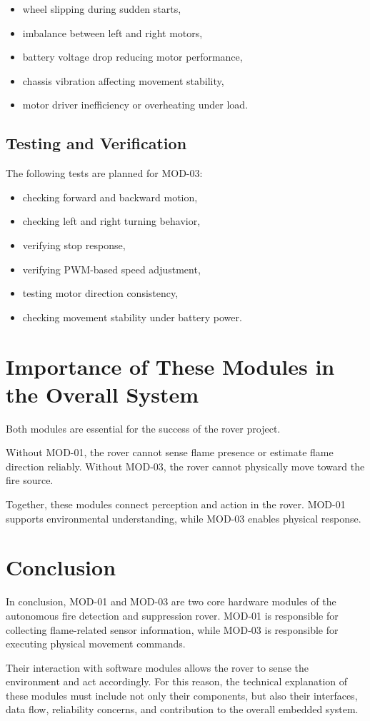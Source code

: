 \documentclass[12pt,a4paper]{article}
\begin{document}
\begin{itemize}[leftmargin=1.2cm]
    \item wheel slipping during sudden starts,
    \item imbalance between left and right motors,
    \item battery voltage drop reducing motor performance,
    \item chassis vibration affecting movement stability,
    \item motor driver inefficiency or overheating under load.
\end{itemize}

\subsection{Testing and Verification}

The following tests are planned for MOD-03:

\begin{itemize}[leftmargin=1.2cm]
    \item checking forward and backward motion,
    \item checking left and right turning behavior,
    \item verifying stop response,
    \item verifying PWM-based speed adjustment,
    \item testing motor direction consistency,
    \item checking movement stability under battery power.
\end{itemize}

\section{Importance of These Modules in the Overall System}

Both modules are essential for the success of the rover project.

Without MOD-01, the rover cannot sense flame presence or estimate flame direction reliably. Without MOD-03, the rover cannot physically move toward the fire source.

Together, these modules connect perception and action in the rover. MOD-01 supports environmental understanding, while MOD-03 enables physical response.

\section{Conclusion}

In conclusion, MOD-01 and MOD-03 are two core hardware modules of the autonomous fire detection and suppression rover. MOD-01 is responsible for collecting flame-related sensor information, while MOD-03 is responsible for executing physical movement commands.

Their interaction with software modules allows the rover to sense the environment and act accordingly. For this reason, the technical explanation of these modules must include not only their components, but also their interfaces, data flow, reliability concerns, and contribution to the overall embedded system.
\end{document}
